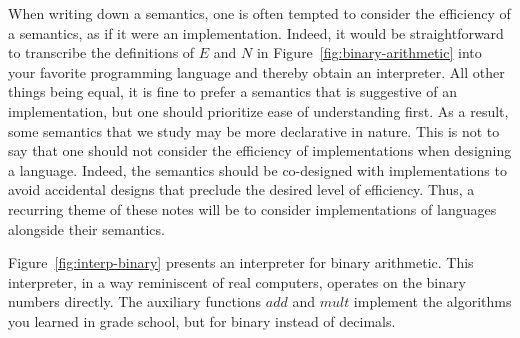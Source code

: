 \documentclass{tufte-handout}
\begin{document}
When writing down a semantics, one is often tempted to consider the
efficiency of a semantics, as if it were an implementation. Indeed, it
would be straightforward to transcribe the definitions of $E$ and $N$
in Figure~\ref{fig:binary-arithmetic} into your favorite programming
language and thereby obtain an interpreter. All other things being
equal, it is fine to prefer a semantics that is suggestive of an
implementation, but one should prioritize ease of understanding first.
As a result, some semantics that we study may be more declarative in
nature. This is not to say that one should not consider the efficiency
of implementations when designing a language.  Indeed, the semantics
should be co-designed with implementations to avoid accidental designs
that preclude the desired level of efficiency.  Thus, a recurring
theme of these notes will be to consider implementations of languages
alongside their semantics.



Figure~\ref{fig:interp-binary} presents an interpreter for binary
arithmetic. This interpreter, in a way reminiscent of real computers,
operates on the binary numbers directly. The auxiliary functions
$\mathit{add}$ and $\mathit{mult}$ implement the algorithms you
learned in grade school, but for binary instead of decimals.
\end{document}
